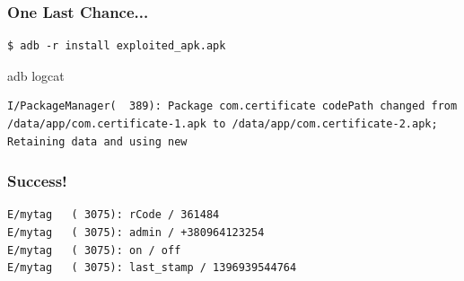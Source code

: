\documentclass[12pt,a4paper]{beamer}
\begin{document}
\begin{frame}[fragile]
\frametitle{One Last Chance...}

\begin{lstlisting}
$ adb -r install exploited_apk.apk
\end{lstlisting}

adb logcat
\begin{lstlisting}
I/PackageManager(  389): Package com.certificate codePath changed from /data/app/com.certificate-1.apk to /data/app/com.certificate-2.apk; Retaining data and using new
\end{lstlisting}

\end{frame}

\begin{frame}[fragile]
\frametitle{Success!}

\begin{lstlisting}
E/mytag   ( 3075): rCode / 361484
E/mytag   ( 3075): admin / +380964123254
E/mytag   ( 3075): on / off
E/mytag   ( 3075): last_stamp / 1396939544764
\end{lstlisting}


\end{frame}
\end{document}

